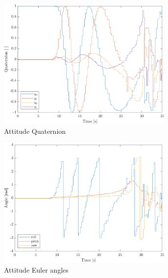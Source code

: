 \begin{figure}[ht]
    \centering   
    \begin{subfigure}{0.45\textwidth}
        \includegraphics[width=0.95\textwidth]{images-results/testflight_q.png}
        \caption{Attitude Quaternion}
        \label{fig:testflight-q}
    \end{subfigure}
    \begin{subfigure}{0.45\textwidth}
        \includegraphics[width=0.95\textwidth]{images-results/testflight_euler.png}
        \caption{Attitude Euler angles}
        \label{fig:testflight-euler}
    \end{subfigure}
    \begin{subfigure}{0.45\textwidth}

\end{subfigure}
\end{figure}
